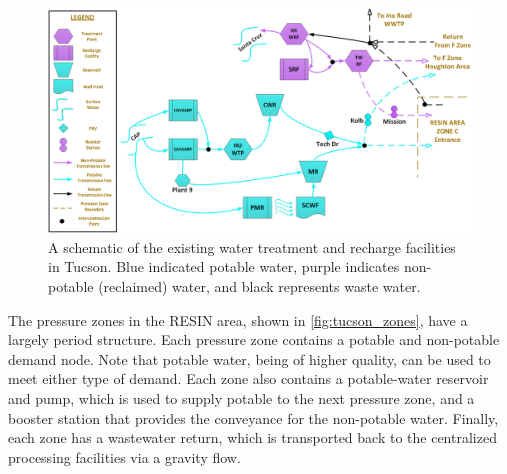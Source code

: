 \documentclass[opre,nonblindrev]{informs3} %
\begin{document}
\begin{figure}
	\FIGURE
	{%
		\includegraphics*[width=.8\textwidth]{tucson_water_images/nodes_central.png}%
	}
	{
		A schematic of the existing water treatment and recharge facilities in Tucson.
		Blue indicated potable water, purple indicates non-potable (reclaimed) water, and black represents waste water.
		\label{fig:tucson_treatment}
	}
	{}
\end{figure}

The pressure zones in the RESIN area, shown in \ref{fig:tucson_zones}, have a largely period structure.
Each pressure zone contains a potable and non-potable demand node.
Note that potable water, being of higher quality, can be used to meet either type of demand.
Each zone also contains a potable-water reservoir and pump, which is used to supply potable to the next pressure zone, and a booster station that provides the conveyance for the non-potable water.
Finally, each zone has a wastewater return, which is transported back to the centralized processing facilities via a gravity flow.
\end{document}
